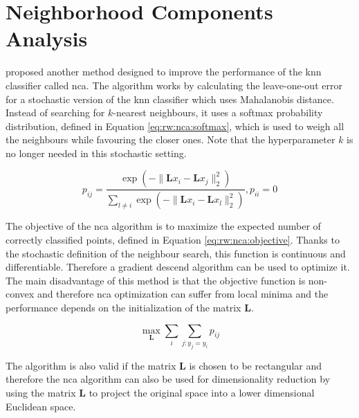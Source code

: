 \documentclass[12pt,a4paper]{report}
\begin{document}

\section{Neighborhood Components Analysis} \label{chap:rw:nca}
\citep{jacobgoldberger2004neighbourhood} proposed another method designed to improve the performance of the \ac{knn} classifier called \acf{nca}. The algorithm works by calculating the leave-one-out error for a stochastic version of the \ac{knn} classifier which uses Mahalanobis distance. Instead of searching for $k$-nearest neighbours, it uses a softmax probability distribution, defined in Equation \ref{eq:rw:nca:softmax}, which is used to weigh all the neighbours while favouring the closer ones. Note that the hyperparameter $k$ is no longer needed in this stochastic setting.

\begin{equation}
p_{ij} = \frac{ \exp(-\lVert \bm{L}x_i-\bm{L}x_j \rVert_2^2) }{ \sum_{l \neq i} \exp(-\lVert \bm{L}x_i-\bm{L}x_l \rVert_2^2) }, p_{ii}=0 \label{eq:rw:nca:softmax}
\end{equation}

The objective of the \ac{nca} algorithm is to maximize the expected number of correctly classified points, defined in Equation \ref{eq:rw:nca:objective}. Thanks to the stochastic definition of the neighbour search, this function is continuous and differentiable. Therefore a gradient descend algorithm can be used to optimize it. The main disadvantage of this method is that the objective function is non-convex and therefore \ac{nca} optimization can suffer from local minima and the performance depends on the initialization of the matrix $\bm{L}$. 

\begin{equation}
\max_{\bm{L}} \sum_i \sum_{j:y_j=y_i} p_{ij} \label{eq:rw:nca:objective}
\end{equation}

The algorithm is also valid if the matrix $\bm{L}$ is chosen to be rectangular and therefore the \ac{nca} algorithm can also be used for dimensionality reduction by using the matrix $\bm{L}$ to project the original space into a lower dimensional Euclidean space.
\end{document}
